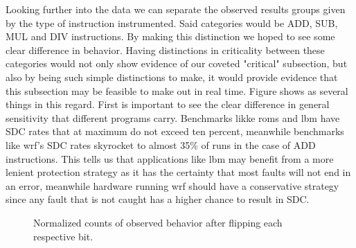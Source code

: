 \documentclass[lettersize,journal]{IEEEtran}
\begin{document}
Looking further into the data we can separate the observed results groups given by the type of instruction instrumented. Said categories would be ADD, SUB, MUL and DIV instructions. By making this distinction we hoped to see some clear difference in behavior. Having distinctions in criticality between these categories would not only show evidence of our coveted "critical" subsection, but also by being such simple distinctions to make, it would provide evidence that this subsection may be feasible to make out in real time. Figure shows as several things in this regard. First is important to see the clear difference in general sensitivity that different programs carry. Benchmarks likke roms and lbm have SDC rates that at maximum do not exceed ten percent, meanwhile benchmarks like wrf's SDC rates skyrocket to almost 35\% of runs in the case of ADD instructions. This tells us that applications like lbm may benefit from a more lenient protection strategy as it has the certainty that most faults will not end in an error, meanwhile hardware running wrf should have a conservative strategy since any fault that is not caught has a higher chance to result in SDC.\\
\begin{figure}[!t] 
    \centering
\caption{Normalized counts of observed behavior after flipping each respective bit.}
\label{categories}
\end{figure}
\end{document}
